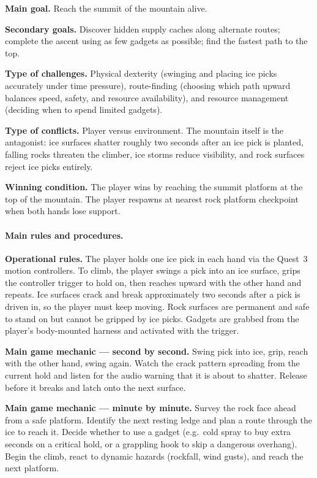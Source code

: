 \documentclass[12pt]{article}
\begin{document}
\textbf{Main goal.} Reach the summit of the mountain alive.

\textbf{Secondary goals.} Discover hidden supply caches along alternate routes; complete the ascent using as few gadgets as possible; find the fastest path to the top.

\textbf{Type of challenges.} Physical dexterity (swinging and placing ice picks accurately under time pressure), route-finding (choosing which path upward balances speed, safety, and resource availability), and resource management (deciding when to spend limited gadgets).

\textbf{Type of conflicts.} Player versus environment. The mountain itself is the antagonist: ice surfaces shatter roughly two seconds after an ice pick is planted, falling rocks threaten the climber, ice storms reduce visibility, and rock surfaces reject ice picks entirely.

\textbf{Winning condition.} The player wins by reaching the summit platform at the top of the mountain. The player respawns at nearest rock platform checkpoint when both hands lose support.

\paragraph{Main rules and procedures.}

\textbf{Operational rules.} The player holds one ice pick in each hand via the Quest~3 motion controllers. To climb, the player swings a pick into an ice surface, grips the controller trigger to hold on, then reaches upward with the other hand and repeats. Ice surfaces crack and break approximately two seconds after a pick is driven in, so the player must keep moving. Rock surfaces are permanent and safe to stand on but cannot be gripped by ice picks. Gadgets are grabbed from the player's body-mounted harness and activated with the trigger.

\textbf{Main game mechanic --- second by second.} Swing pick into ice, grip, reach with the other hand, swing again. Watch the crack pattern spreading from the current hold and listen for the audio warning that it is about to shatter. Release before it breaks and latch onto the next surface.

\textbf{Main game mechanic --- minute by minute.} Survey the rock face ahead from a safe platform. Identify the next resting ledge and plan a route through the ice to reach it. Decide whether to use a gadget (e.g.\ cold spray to buy extra seconds on a critical hold, or a grappling hook to skip a dangerous overhang). Begin the climb, react to dynamic hazards (rockfall, wind gusts), and reach the next platform.
\end{document}

